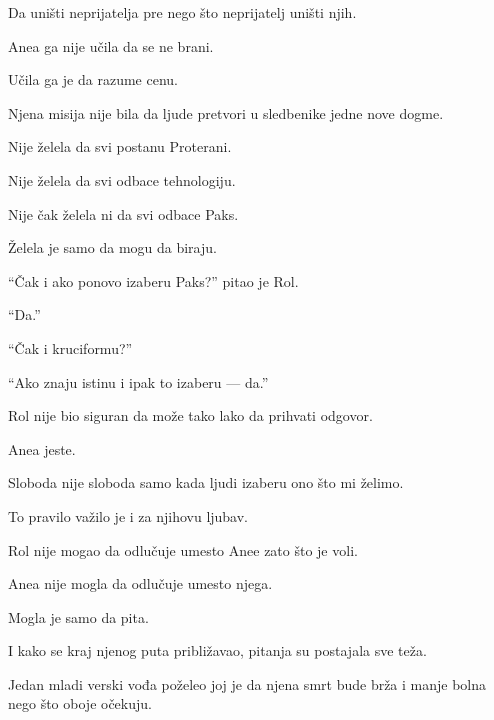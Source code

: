 Da uništi neprijatelja pre nego što neprijatelj uništi njih.

\bigskip

Anea ga nije učila da se ne brani.

\bigskip

Učila ga je da razume cenu.

\bigskip

Njena misija nije bila da ljude pretvori u sledbenike jedne nove dogme.

\bigskip

Nije želela da svi postanu Proterani.

Nije želela da svi odbace tehnologiju.

Nije čak želela ni da svi odbace Paks.

\bigskip

Želela je samo da mogu da biraju.

\bigskip

``Čak i ako ponovo izaberu Paks?'' pitao je Rol.

``Da.''

\bigskip

``Čak i kruciformu?''

``Ako znaju istinu i ipak to izaberu --- da.''

\bigskip

Rol nije bio siguran da može tako lako da prihvati odgovor.

\bigskip

Anea jeste.

\bigskip

Sloboda nije sloboda samo kada ljudi izaberu ono što mi želimo.

\bigskip

To pravilo važilo je i za njihovu ljubav.

\bigskip

Rol nije mogao da odlučuje umesto Anee zato što je voli.

\bigskip

Anea nije mogla da odlučuje umesto njega.

\bigskip

Mogla je samo da pita.

\bigskip

I kako se kraj njenog puta približavao, pitanja su postajala sve teža.

\bigskip

Jedan mladi verski vođa poželeo joj je da njena smrt bude brža i manje bolna nego što oboje očekuju.

